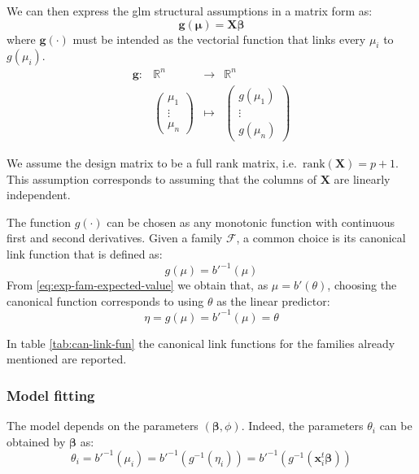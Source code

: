 \documentclass[a4paper, twoside, openright, 12pt]{report}
\theoremstyle{definition}
\theoremstyle{definition}
\theoremstyle{definition}
\theoremstyle{remark}
\begin{document}
We can then express the \ac{glm} structural assumptions in a matrix form as:
\[
\boldsymbol{g}(\boldsymbol{\mu}) = \boldsymbol{X} \boldsymbol{\beta}
\]
where \(\boldsymbol{g}(\cdot)\) must be intended as the vectorial function that links every \(\mu_i\) to \(g(\mu_i)\).
\[
\begin{array}{cccc}
\boldsymbol{g}: & \mathbb{R}^n & \longrightarrow & \mathbb{R}^n \\
                & \left(
                    \begin{matrix} \mu_1  \\ \vdots \\ \mu_n \end{matrix}
                  \right)
                  & \longmapsto & 
                  \left(
                    \begin{matrix} g(\mu_1)  \\ \vdots \\ g(\mu_n) \end{matrix}
                  \right)
\end{array}
\]

We assume the design matrix to be a full rank matrix, i.e.~\(\text{rank}(\boldsymbol{X}) = p+1\). This assumption corresponds to assuming that the columns of \(\boldsymbol{X}\) are linearly independent.

The function \(g(\cdot)\) can be chosen as any monotonic function with continuous first and second derivatives. Given a family \(\mathcal{F}\), a common choice is its canonical link function that is defined as:
\[
g(\mu) = b'^{-1}(\mu)
\]
From \eqref{eq:exp-fam-expected-value} we obtain that, as \(\mu = b'(\theta)\), choosing the canonical function corresponds to using \(\theta\) as the linear predictor:
\[
\eta = g(\mu) = b'^{-1}(\mu) = \theta
\]

In table \ref{tab:can-link-fun} the canonical link functions for the families already mentioned are reported.

\hypertarget{chap:glm-model-fitting}{%
\subsubsection{Model fitting}\label{chap:glm-model-fitting}}

The model depends on the parameters \(\left(\boldsymbol{\beta}, \phi\right)\). Indeed, the parameters \(\theta_i\) can be obtained by \(\boldsymbol{\beta}\) as:
\[
\theta_i = b'^{-1}(\mu_i) = b'^{-1}(g^{-1}(\eta_i)) = b'^{-1}\left(g^{-1}\left(\boldsymbol{x}_i^t\boldsymbol{\beta}\right)\right)
\]
\end{document}
